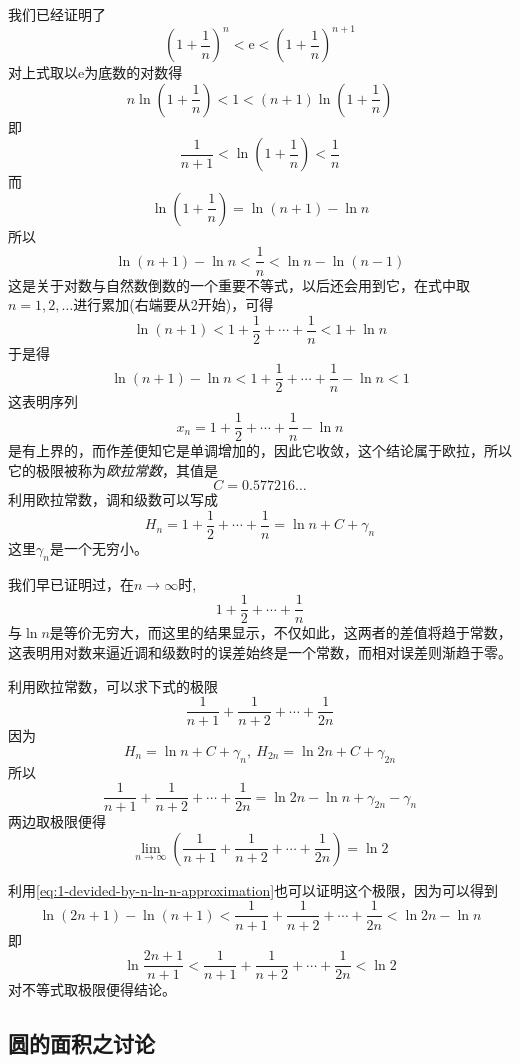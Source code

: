 我们已经证明了
\[ \left( 1+\frac{1}{n} \right)^n < \mathrm{e} < \left( 1+\frac{1}{n} \right)^{n+1} \]
对上式取以$\mathrm{e}$为底数的对数得
\[ n \ln{\left( 1+\frac{1}{n} \right)} < 1 < (n+1)\ln{\left( 1+\frac{1}{n} \right)} \]
即
\[ \frac{1}{n+1} < \ln{\left( 1+\frac{1}{n} \right)} < \frac{1}{n} \]
而
\[ \ln{\left( 1+\frac{1}{n} \right)} = \ln{(n+1)}-\ln{n} \]
所以
\begin{equation}
  \label{eq:1-devided-by-n-ln-n-approximation}
 \ln{(n+1)}-\ln{n} < \frac{1}{n} < \ln{n}-\ln{(n-1)} 
\end{equation}
这是关于对数与自然数倒数的一个重要不等式，以后还会用到它，在式中取$n=1,2,\ldots$进行累加(右端要从2开始)，可得
\[ \ln{(n+1)} < 1 + \frac{1}{2} + \cdots + \frac{1}{n} < 1+\ln{n} \]
于是得
\[ \ln{(n+1)}-\ln{n} < 1 + \frac{1}{2} + \cdots + \frac{1}{n} - \ln{n} < 1 \]
这表明序列
\[ x_n = 1 + \frac{1}{2} + \cdots + \frac{1}{n} - \ln{n} \]
是有上界的，而作差便知它是单调增加的，因此它收敛，这个结论属于欧拉，所以它的极限被称为\emph{欧拉常数}，其值是
\[ C=0.577216\ldots \]
利用欧拉常数，调和级数可以写成
\[ H_n = 1 + \frac{1}{2} + \cdots + \frac{1}{n} = \ln{n} + C + \gamma_n \]
这里$\gamma_n$是一个无穷小。

我们早已证明过，在$n \to \infty$时,
\[ 1 + \frac{1}{2} + \cdots + \frac{1}{n} \]
与$\ln{n}$是等价无穷大，而这里的结果显示，不仅如此，这两者的差值将趋于常数，这表明用对数来逼近调和级数时的误差始终是一个常数，而相对误差则渐趋于零。

\begin{example}
  \label{example:limit-of-sum-of-i/n+1-i-in-(1-n)}
  利用欧拉常数，可以求下式的极限
  \[ \frac{1}{n+1}+\frac{1}{n+2}+\cdots+\frac{1}{2n} \]
  因为
  \[ H_n = \ln{n} + C + \gamma_n, \  H_{2n}=\ln{2n}+C+\gamma_{2n} \]
  所以
  \[ \frac{1}{n+1}+\frac{1}{n+2}+\cdots+\frac{1}{2n} = \ln{2n}-\ln{n}+\gamma_{2n}-\gamma_n \]
  两边取极限便得
  \[ \lim_{n \to \infty} \left( \frac{1}{n+1}+\frac{1}{n+2}+\cdots+\frac{1}{2n} \right) = \ln{2} \]

  利用\autoref{eq:1-devided-by-n-ln-n-approximation}也可以证明这个极限，因为可以得到
  \[ \ln{(2n+1)}-\ln{(n+1)} < \frac{1}{n+1}+\frac{1}{n+2}+\cdots+\frac{1}{2n} < \ln{2n}-\ln{n} \]
  即
  \[ \ln{\frac{2n+1}{n+1}} < \frac{1}{n+1}+\frac{1}{n+2}+\cdots+\frac{1}{2n} < \ln{2} \]
  对不等式取极限便得结论。
\end{example}

\subsection{圆的面积之讨论}
\label{sec:pi}

